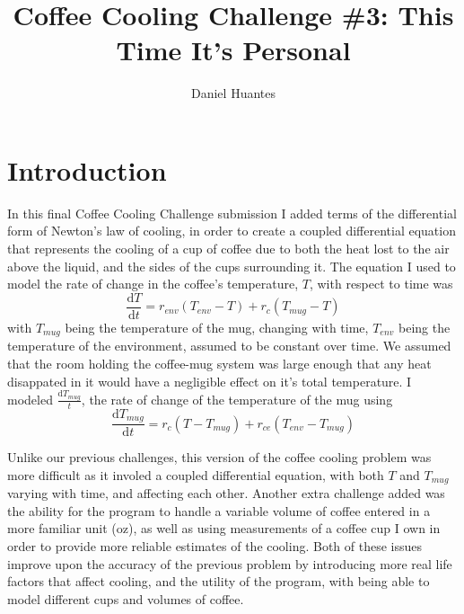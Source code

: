 \documentclass[12pt]{article}
\begin{document}
\title{Coffee Cooling Challenge \#3: This Time It's Personal}
\author{Daniel Huantes}
\twocolumn
\maketitle
\section{Introduction}
In this final Coffee Cooling Challenge submission I added terms of the differential form of Newton's law of cooling, in order to create a coupled differential equation that represents the cooling of a cup of coffee due to both the heat lost to the air above the liquid, and the sides of the cups surrounding it. The equation I used to model the rate of change in the coffee's temperature, $T$, with respect to time was 
\begin{equation}
\frac{\mathrm{d} T}{\mathrm{d} t} = r_{env} (T_{env} - T) + r_{c} (T_{mug} - T)
\end{equation}
with $T_{mug}$ being the temperature of the mug, changing with time, $T_{env}$ being the temperature of the environment, assumed to be constant over time. We assumed that the room holding the coffee-mug system was large enough that any heat disappated in it would have a negligible effect on it's total temperature. I modeled $\frac{\mathrm{d} T_{mug}}{t}$, the rate of change of the temperature of the mug using
\begin{equation}
\frac{\mathrm{d} T_{mug}}{\mathrm{d} t} = r_{c} (T - T_{mug}) + r_{ce} (T_{env} - T_{mug})
\end{equation}

Unlike our previous challenges, this version of the coffee cooling problem was more difficult as it involed a coupled differential equation, with both $T$ and $T_{mug}$ varying with time, and affecting each other. Another extra challenge added was the ability for the program to handle a variable volume of coffee entered in a more familiar unit (oz), as well as using measurements of a coffee cup I own in order to provide more reliable estimates of the cooling. Both of these issues improve upon the accuracy of the previous problem by introducing more real life factors that affect cooling, and the utility of the program, with being able to model different cups and volumes of coffee.
\end{document}
